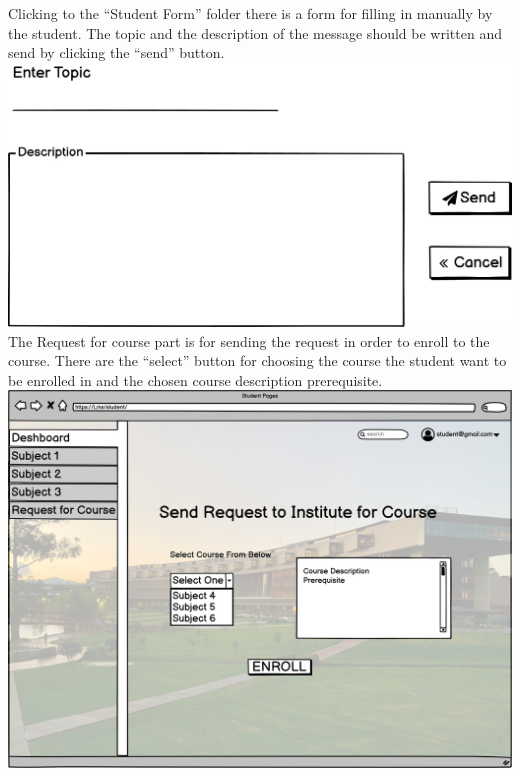 Clicking to the “Student Form” folder there is a form for filling in manually by the student. The topic and the description of the message should be written and send by clicking the “send” button.\\

\includegraphics[width=0.65\columnwidth]{images/Student Form_2.png}
\newpage
The Request for course part is for sending the request in order to enroll to the course. There are the “select” button for choosing the course the student want to be enrolled in and the chosen course description prerequisite.\\

\includegraphics[width=\columnwidth]{images/Request for Course.png}